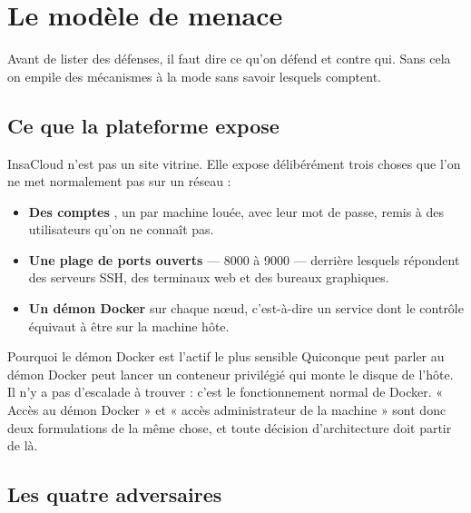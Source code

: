 \chapter{Le modèle de menace}

Avant de lister des défenses, il faut dire ce qu'on défend et contre qui. Sans
cela on empile des mécanismes à la mode sans savoir lesquels comptent.

\section*{Ce que la plateforme expose}

InsaCloud n'est pas un site vitrine. Elle expose délibérément trois choses que
l'on ne met normalement pas sur un réseau :

\begin{itemize}[leftmargin=14pt,itemsep=3pt]
\item \textbf{Des comptes }, un par machine louée, avec leur mot de
      passe, remis à des utilisateurs qu'on ne connaît pas.
\item \textbf{Une plage de ports ouverts} --- 8000 à 9000 --- derrière lesquels
      répondent des serveurs SSH, des terminaux web et des bureaux graphiques.
\item \textbf{Un démon Docker} sur chaque nœud, c'est-à-dire un service dont le
      contrôle équivaut à être  sur la machine hôte.
\end{itemize}

\begin{notion}{Pourquoi le démon Docker est l'actif le plus sensible}
Quiconque peut parler au démon Docker peut lancer un conteneur privilégié qui
monte le disque de l'hôte. Il n'y a pas d'escalade à trouver : c'est le
fonctionnement normal de Docker. « Accès au démon Docker » et « accès
administrateur de la machine » sont donc deux formulations de la même chose, et
toute décision d'architecture doit partir de là.
\end{notion}

\section*{Les quatre adversaires}

